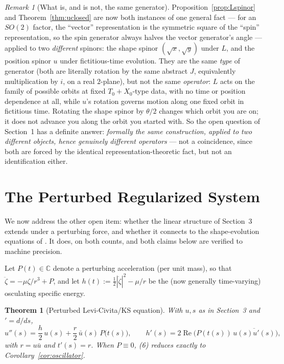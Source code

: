 \documentclass[12pt]{amsart}
\theoremstyle{plain}
\newtheorem{theorem}{Theorem}[section]
\theoremstyle{remark}
\newtheorem*{remark}{Remark}
\begin{document}
\begin{remark}[What is, and is not, the same generator]
Proposition~\ref{prop:Lspinor} and Theorem~\ref{thm:uclosed} are now both instances of one general fact --- for an $SO(2)$ factor, the ``vector'' representation is the symmetric square of the ``spin'' representation, so the spin generator always halves the vector generator's angle --- applied to two \emph{different} spinors: the shape spinor $(\sqrt x,\sqrt y)$ under $L$, and the position spinor $u$ under fictitious-time evolution. They are the same \emph{type} of generator (both are literally rotation by the same abstract $J$, equivalently multiplication by $i$, on a real $2$-plane), but not the same \emph{operator}: $L$ acts on the family of possible orbits at fixed $T_0+X_0$-type data, with no time or position dependence at all, while $u$'s rotation governs motion along one fixed orbit in fictitious time. Rotating the shape spinor by $\theta/2$ changes which orbit you are on; it does not advance you along the orbit you started with. So the open question of Section~1 has a definite answer: \emph{formally the same construction, applied to two different objects, hence genuinely different operators} --- not a coincidence, since both are forced by the identical representation-theoretic fact, but not an identification either.
\end{remark}

\section{The Perturbed Regularized System}

We now address the other open item: whether the linear structure of Section~3 extends under a perturbing force, and whether it connects to the shape-evolution equations of \cite{Ebert2026Cone}. It does, on both counts, and both claims below are verified to machine precision.

Let $P(t)\in\mathbb C$ denote a perturbing acceleration (per unit mass), so that $\ddot\zeta=-\mu\zeta/r^3+P$, and let $h(t):=\tfrac12|\dot\zeta|^2-\mu/r$ be the (now generally time-varying) osculating specific energy.

\begin{theorem}[Perturbed Levi-Civita/KS equation]\label{thm:perturbed}
With $u,s$ as in Section~3 and $'=d/ds$,
\begin{equation}
u''(s) = \frac{h}{2}\,u(s) + \frac{r}{2}\,\bar u(s)\,P\big(t(s)\big), \qquad
h'(s) = 2\operatorname{Re}\!\big(P(t(s))\,\overline{u(s)u'(s)}\big), \tag{6}
\end{equation}
with $r=u\bar u$ and $t'(s)=r$. When $P\equiv0$, (6) reduces exactly to Corollary~\ref{cor:oscillator}.
\end{theorem}
\end{document}
